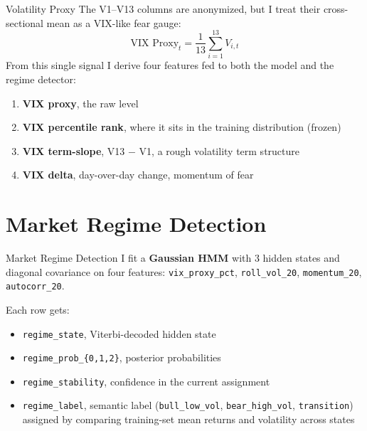 \documentclass[aspectratio=169]{beamer}
\begin{document}
\begin{frame}{Volatility Proxy}
The V1--V13 columns are anonymized, but I treat their cross-sectional mean as a VIX-like fear gauge:
\[
\text{VIX Proxy}_t = \frac{1}{13} \sum_{i=1}^{13} V_{i,t}
\]
\vspace{0.1cm}
From this single signal I derive four features fed to both the model and the regime detector:
\begin{enumerate}
    \item \textbf{VIX proxy}, the raw level
    \item \textbf{VIX percentile rank}, where it sits in the training distribution (frozen)
    \item \textbf{VIX term-slope}, V13 $-$ V1, a rough volatility term structure
    \item \textbf{VIX delta}, day-over-day change, momentum of fear
\end{enumerate}
\end{frame}


\section{Market Regime Detection}

\begin{frame}{Market Regime Detection}
I fit a \textbf{Gaussian HMM} with 3 hidden states and diagonal covariance on four features:
\texttt{vix\_proxy\_pct}, \texttt{roll\_vol\_20}, \texttt{momentum\_20}, \texttt{autocorr\_20}.

\vspace{0.25cm}
Each row gets:
\begin{itemize}
    \item \texttt{regime\_state}, Viterbi-decoded hidden state
    \item \texttt{regime\_prob\_\{0,1,2\}}, posterior probabilities
    \item \texttt{regime\_stability}, confidence in the current assignment
    \item \texttt{regime\_label}, semantic label (\texttt{bull\_low\_vol}, \texttt{bear\_high\_vol}, \texttt{transition}) assigned by comparing training-set mean returns and volatility across states
\end{itemize}
\end{frame}
\end{document}
